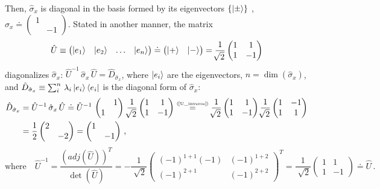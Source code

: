 \documentclass[11pt]{article}
\numberwithin{equation}{section} %
\numberwithin{figure}{section} %
\newcommand\numeq[1] %
  {\stackrel{\scriptscriptstyle(\mkern-1.5mu#1\mkern-1.5mu)}{=}}
\begin{document}
\begin{appendices}
Then, $\hat{\sigma}_x$ is diagonal in the basis formed by its eigenvectors $\{\ket{\pm}\}$ , $\hat{\sigma}_x\doteq  \begin{pmatrix}1&\\&-1\end{pmatrix}$. Stated in another manner, the matrix 
\begin{equation} 
\hat{U}\equiv \begin{pmatrix} \ket{e_1}&\ket{e_2}&\dots&\ket{e_n}
\end{pmatrix} \doteq\begin{pmatrix} \ket{+} & \ket{-}\end{pmatrix} = \frac{1}{\sqrt[]{2}}\begin{pmatrix} 1&1\\1&-1 \end{pmatrix}
\end{equation}
diagonalizes $\hat{\sigma}_x$: $\hat{U}^{-1}\,\hat{\sigma}_x\,\hat{U}=\hat{D}_{\hat{\sigma}_x}$, where $\ket{e_i}$ are the eigenvectors, $n=\dim(\hat{\sigma}_x)$, and $\hat{D}_{\hat{\sigma}_x}\equiv \sum_i^n\,\lambda_i \ket{e_i}\bra{e_i}$ is the diagonal form of $\hat{\sigma}_x$:
\begin{equation} \label{diagonal_sigma_x}
\begin{split}
\hat{D}_{\hat{\sigma}_x}
&	= \hat{U}^{-1}\,\hat{\sigma}_x\,\hat{U} \doteq  \hat{U}^{-1}\,\begin{pmatrix}&1\\1&\end{pmatrix} \,\frac{1}{\sqrt[]{2}}\begin{pmatrix}1&1\\1&-1\end{pmatrix} \numeq{\textrm{\ref{U_inverse}}} \frac{1}{\sqrt[]{2}}\begin{pmatrix}1&1\\1&-1\end{pmatrix} \frac{1}{\sqrt[]{2}}\begin{pmatrix}1&-1\\1&1\end{pmatrix}\\
&	= \frac{1}{2}\begin{pmatrix}2&\\&-2\end{pmatrix} = \begin{pmatrix}1&\\&-1\end{pmatrix}\,,
\end{split}
\end{equation}
\begin{equation} \label{U_inverse}
\textrm{where}\quad\hat{U}^{-1}=\frac{\left(adj(\hat{U})\right)^T}{\det(\hat{U})} = -\frac{1}{\sqrt[]{2}}\begin{pmatrix}(-1)^{1+1}(-1)&(-1)^{1+2}\\(-1)^{2+1}&(-1)^{2+2} \end{pmatrix}^T = \frac{1}{\sqrt[]{2}}\begin{pmatrix}1&1\\1&-1\end{pmatrix}\doteq \hat{U}\,.
\end{equation}


\end{appendices}
\end{document}
